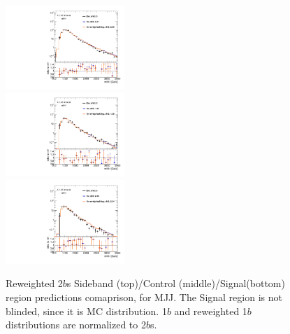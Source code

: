 \begin{figure}[htbp!]
\begin{center}
\includegraphics[angle=270, width=0.4\textwidth]{./figures/boosted/AppendixReweight/Compare/Dijet_Sideband_directcompare_mHH_l_1.pdf}\\
\includegraphics[angle=270, width=0.4\textwidth]{./figures/boosted/AppendixReweight/Compare/Dijet_Control_directcompare_mHH_l_1.pdf}\\
\includegraphics[angle=270, width=0.4\textwidth]{./figures/boosted/AppendixReweight/Compare/Dijet_Signal_directcompare_mHH_l_1.pdf}
\caption{Reweighted 2$b$s Sideband (top)/Control (middle)/Signal(bottom) region predictions comaprison, for MJJ. The Signal region is not blinded, since it is MC distribution. 1$b$ and reweighted 1$b$ distributions are normalized to 2$b$s.}
\label{fig:app-rw-comp-dijet-2bs}
\end{center}
\end{figure}

